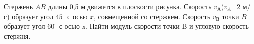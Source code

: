 Стержень $AB$ длины 0,5 м движется в плоскости рисунка. Скорость $v_{А}$($v_{A}$=2 м/с) образует угол
$45^{\circ}$ с осью $x$, совмещенной со стержнем.
Скорость $v_{В}$ точки $B$ образует угол $60^{\circ}$ с осью x. Найти модуль скорости точки B и 
угловую скорость стержня.
